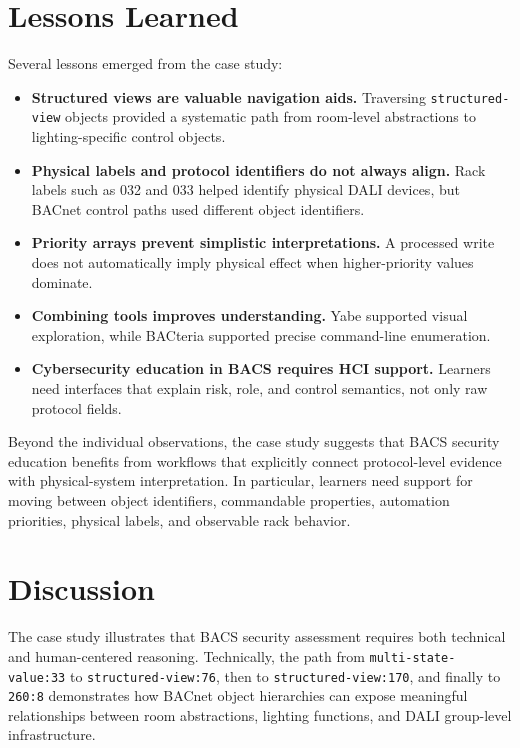 \documentclass[10pt,conference]{IEEEtran}
\begin{document}
\section{Lessons Learned}

Several lessons emerged from the case study:

\begin{itemize}
    \item \textbf{Structured views are valuable navigation aids.} Traversing \texttt{structured-view} objects provided a systematic path from room-level abstractions to lighting-specific control objects.
    \item \textbf{Physical labels and protocol identifiers do not always align.} Rack labels such as 032 and 033 helped identify physical DALI devices, but BACnet control paths used different object identifiers.
    \item \textbf{Priority arrays prevent simplistic interpretations.} A processed write does not automatically imply physical effect when higher-priority values dominate.
    \item \textbf{Combining tools improves understanding.} Yabe supported visual exploration, while BACteria supported precise command-line enumeration.
    \item \textbf{Cybersecurity education in BACS requires HCI support.} Learners need interfaces that explain risk, role, and control semantics, not only raw protocol fields.
\end{itemize}

Beyond the individual observations, the case study suggests that BACS security education benefits from workflows that explicitly connect protocol-level evidence with physical-system interpretation. In particular, learners need support for moving between object identifiers, commandable properties, automation priorities, physical labels, and observable rack behavior. 

\section{Discussion}

The case study illustrates that BACS security assessment requires both technical and human-centered reasoning. Technically, the path from \texttt{multi-state-value:33} to \texttt{structured-view:76}, then to \texttt{structured-view:170}, and finally to \texttt{260:8} demonstrates how BACnet object hierarchies can expose meaningful relationships between room abstractions, lighting functions, and DALI group-level infrastructure.
\end{document}
